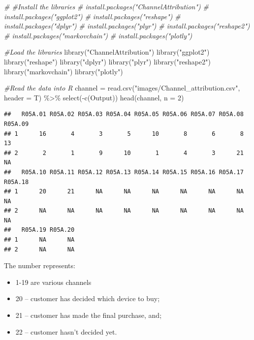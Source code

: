 \documentclass[
]{book}
\newenvironment{Shaded}{\begin{snugshade}}{\end{snugshade}}
\newcommand{\AttributeTok}[1]{\textcolor[rgb]{0.77,0.63,0.00}{#1}}
\newcommand{\CommentTok}[1]{\textcolor[rgb]{0.56,0.35,0.01}{\textit{#1}}}
\newcommand{\DecValTok}[1]{\textcolor[rgb]{0.00,0.00,0.81}{#1}}
\newcommand{\FunctionTok}[1]{\textcolor[rgb]{0.00,0.00,0.00}{#1}}
\newcommand{\NormalTok}[1]{#1}
\newcommand{\OtherTok}[1]{\textcolor[rgb]{0.56,0.35,0.01}{#1}}
\newcommand{\SpecialCharTok}[1]{\textcolor[rgb]{0.00,0.00,0.00}{#1}}
\newcommand{\StringTok}[1]{\textcolor[rgb]{0.31,0.60,0.02}{#1}}
\providecommand{\tightlist}{%
  \setlength{\itemsep}{0pt}\setlength{\parskip}{0pt}}
\begin{document}
\begin{Shaded}
\begin{Highlighting}[]
\CommentTok{\# \#Install the libraries}
\CommentTok{\# install.packages("ChannelAttribution")}
\CommentTok{\# install.packages("ggplot2")}
\CommentTok{\# install.packages("reshape")}
\CommentTok{\# install.packages("dplyr")}
\CommentTok{\# install.packages("plyr")}
\CommentTok{\# install.packages("reshape2")}
\CommentTok{\# install.packages("markovchain")}
\CommentTok{\# install.packages("plotly")}

\CommentTok{\#Load the libraries}
\FunctionTok{library}\NormalTok{(}\StringTok{"ChannelAttribution"}\NormalTok{)}
\FunctionTok{library}\NormalTok{(}\StringTok{"ggplot2"}\NormalTok{)}
\FunctionTok{library}\NormalTok{(}\StringTok{"reshape"}\NormalTok{)}
\FunctionTok{library}\NormalTok{(}\StringTok{"dplyr"}\NormalTok{)}
\FunctionTok{library}\NormalTok{(}\StringTok{"plyr"}\NormalTok{)}
\FunctionTok{library}\NormalTok{(}\StringTok{"reshape2"}\NormalTok{)}
\FunctionTok{library}\NormalTok{(}\StringTok{"markovchain"}\NormalTok{)}
\FunctionTok{library}\NormalTok{(}\StringTok{"plotly"}\NormalTok{)}

\CommentTok{\#Read the data into R}
\NormalTok{channel }\OtherTok{=} \FunctionTok{read.csv}\NormalTok{(}\StringTok{"images/Channel\_attribution.csv"}\NormalTok{, }\AttributeTok{header =}\NormalTok{ T) }\SpecialCharTok{\%\textgreater{}\%} \FunctionTok{select}\NormalTok{(}\SpecialCharTok{{-}}\FunctionTok{c}\NormalTok{(Output))}
\FunctionTok{head}\NormalTok{(channel, }\AttributeTok{n =} \DecValTok{2}\NormalTok{)}
\end{Highlighting}
\end{Shaded}

\begin{verbatim}
##   R05A.01 R05A.02 R05A.03 R05A.04 R05A.05 R05A.06 R05A.07 R05A.08 R05A.09
## 1      16       4       3       5      10       8       6       8      13
## 2       2       1       9      10       1       4       3      21      NA
##   R05A.10 R05A.11 R05A.12 R05A.13 R05A.14 R05A.15 R05A.16 R05A.17 R05A.18
## 1      20      21      NA      NA      NA      NA      NA      NA      NA
## 2      NA      NA      NA      NA      NA      NA      NA      NA      NA
##   R05A.19 R05A.20
## 1      NA      NA
## 2      NA      NA
\end{verbatim}

The number represents:

\begin{itemize}
\tightlist
\item
  1-19 are various channels
\item
  20 -- customer has decided which device to buy;
\item
  21 -- customer has made the final purchase, and;
\item
  22 -- customer hasn't decided yet.
\end{itemize}
\end{document}
